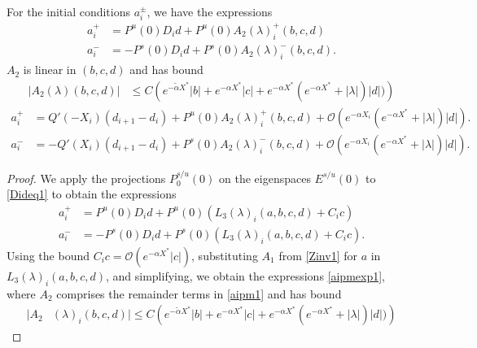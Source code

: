 \documentclass[thesis.tex]{subfiles}
\begin{document}
\begin{lemma}\label{lemma:aipm}
For the initial conditions $a_i^\pm$, we have the expressions
\begin{equation}\label{aipmexp1}
\begin{aligned}
a_i^+ &= P^u(0) D_i d + P^u(0) A_2(\lambda)_i^+(b, c, d)  \\
a_i^- &= -P^s(0) D_i d + P^s(0) A_2(\lambda)_i^-(b, c, d).
\end{aligned}
\end{equation}
$A_2$ is linear in $(b, c, d)$ and has bound
\begin{align}
|A_2(\lambda)(b, c, d)|
&\leq C \left(e^{-\tilde{\alpha} X^*}|b| + e^{-\alpha X^*}|c| + e^{-\alpha X^*}(e^{-\alpha X^*} + |\lambda|)|d| ) \right) \label{A2bound}
\end{align}
\begin{equation}\label{aipmexp1}
\begin{aligned}
a_i^+ &= Q'(-X_i) (d_{i+1} - d_i ) + P^u(0) A_2(\lambda)_i^+(b, c, d) + \mathcal{O}( e^{-\alpha X_i} (e^{-\alpha X^*} + |\lambda| )|d|) .\\
a_i^- &= -Q'(X_i) (d_{i+1} - d_i ) + P^s(0) A_2(\lambda)_i^-(b, c, d) + \mathcal{O}( e^{-\alpha X_i} (e^{-\alpha X^*} + |\lambda| )|d|) .
\end{aligned}
\end{equation}

\begin{proof}
We apply the projections $P_0^{s/u}(0)$ on the eigenspaces $E^{s/u}(0)$ to \eqref{Dideq1} to obtain the expressions
\begin{equation}\label{aipm1}
\begin{aligned}
a_i^+ &= P^u(0) D_i d + P^u(0) \left( L_3(\lambda)_i(a, b, c, d) +  C_i c \right) \\
a_i^- &= -P^s(0) D_i d + P^s(0) \left( L_3(\lambda)_i(a, b, c, d) + C_i c \right).
\end{aligned}
\end{equation}
Using the bound $C_i c = \mathcal{O}(e^{-\alpha X^*}|c|)$, substituting $A_1$ from \cref{Zinv1} for $a$ in $L_3(\lambda)_i(a, b, c, d)$, and simplifying, we obtain the expressions \cref{aipmexp1}, where $A_2$ comprises the remainder terms in \cref{aipm1} and has bound
\begin{align*}
|A_2&(\lambda)_i(b, c, d)| \leq C \left(e^{-\tilde{\alpha} X^*}|b| + e^{-\alpha X^*}|c| + e^{-\alpha X^*}(e^{-\alpha X^*} + |\lambda|)|d| ) \right)
\end{align*}


\end{proof}
\end{lemma}
\end{document}
